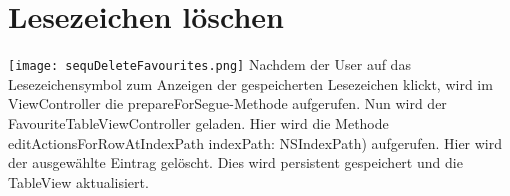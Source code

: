 \section{Lesezeichen löschen}
\texttt{[image: sequDeleteFavourites.png]}
Nachdem der User auf das Lesezeichensymbol zum Anzeigen der gespeicherten Lesezeichen klickt, wird im ViewController die prepareForSegue-Methode aufgerufen. Nun wird der FavouriteTableViewController geladen. Hier wird die Methode editActionsForRowAtIndexPath indexPath: NSIndexPath) aufgerufen. Hier wird der ausgewählte Eintrag gelöscht. Dies wird persistent gespeichert und die TableView aktualisiert.
\pagebreak
